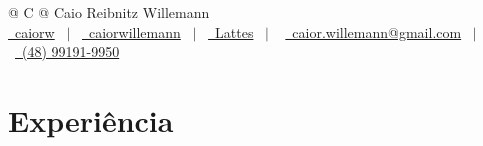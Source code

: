 \documentclass[a4paper,12pt]{article}
\begin{document}
\pagestyle{empty} 



\begin{tabularx}{\linewidth}{@{} C @{}}
\vspace{0.4cm}
\Huge{Caio Reibnitz Willemann} \\[9pt]
\href{https://github.com/caiorw}{\raisebox{-0.05\height}\faGithub\ caiorw} \ $|$ \ 
\href{https://linkedin.com/in/caiorwillemann}{\raisebox{-0.05\height}\faLinkedin\ caiorwillemann} \ $|$ \ 
\href{http://lattes.cnpq.br/1041661551878827}{\raisebox{-0.05\height}\faAddressCard \ Lattes} \ $|$ \
\href{mailto:caior.willemann@gmail.com}{\raisebox{-0.05\height}\faEnvelope \ caior.willemann@gmail.com} \ $|$ \ 
\href{tel:+5548991919950}{\raisebox{-0.05\height}\faMobile \ (48) 99191-9950} \\
\end{tabularx}



\section{Experiência}
\end{document}
